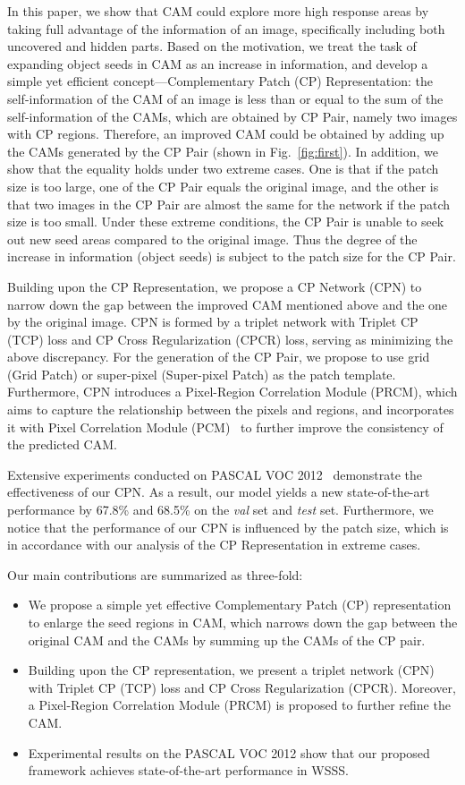 \documentclass[10pt,twocolumn,letterpaper]{article}
\begin{document}
In this paper, we show that CAM could explore more high response areas by taking full advantage of the information of an image, specifically including both uncovered and hidden parts. Based on the motivation, we treat the task of expanding object seeds in CAM as an increase in information, and develop a simple yet efficient concept---Complementary Patch (CP) Representation: the self-information of the CAM of an image is less than or equal to the sum of the self-information of the CAMs, which are obtained by CP Pair, namely two images with CP regions. Therefore, an improved CAM could be obtained by adding up the CAMs generated by the CP Pair (shown in Fig.~\ref{fig:first}). In addition, we show that the equality holds under two extreme cases. One is that if the patch size is too large, one of the CP Pair equals the original image, and the other is that two images in the CP Pair are almost the same for the network if the patch size is too small. Under these extreme conditions, the CP Pair is unable to seek out new seed areas compared to the original image. Thus the degree of the increase in information (object seeds) is subject to the patch size for the CP Pair.

Building upon the CP Representation, we propose a CP Network (CPN) to narrow down the gap between the improved CAM mentioned above and the one by the original image. CPN is formed by a triplet network with Triplet CP (TCP) loss and CP Cross Regularization (CPCR) loss, serving as minimizing the above discrepancy. For the generation of the CP Pair, we propose to use grid (Grid Patch) or super-pixel (Super-pixel Patch) as the patch template. Furthermore, CPN introduces a Pixel-Region Correlation Module (PRCM), which aims to capture the relationship between the pixels and regions, and incorporates it with Pixel Correlation Module (PCM)~\cite{seam} to further improve the consistency of the predicted CAM.

Extensive experiments conducted on PASCAL VOC 2012~\cite{voc12} demonstrate the effectiveness of our CPN. As a result, our model yields a new state-of-the-art performance by 67.8\% and 68.5\% on the \textit{val} set and \textit{test} set.
Furthermore, we notice that the performance of our CPN is influenced by the patch size, which is in accordance with our analysis of the CP Representation in extreme cases.

Our main contributions are summarized as three-fold:
\begin{itemize}
\item[] We propose a simple yet effective Complementary Patch (CP) representation to enlarge the seed regions in CAM, which narrows down the gap between the original CAM and the CAMs by summing up the CAMs of the CP pair.
\item[] Building upon the CP representation, we present a triplet network (CPN) with Triplet CP (TCP) loss and CP Cross Regularization (CPCR). Moreover, a Pixel-Region Correlation Module (PRCM) is proposed to further refine the CAM.
\item[] Experimental results on the PASCAL VOC 2012 show that our proposed framework achieves state-of-the-art performance in WSSS.
\end{itemize}
\end{document}
